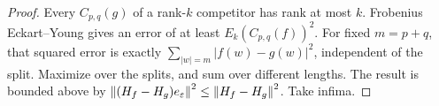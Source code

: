 \begin{proof}
Every $C_{p,q}(g)$ of a rank-$k$ competitor has rank at most $k$. Frobenius Eckart--Young gives an error of at least $E_k(C_{p,q}(f))^2$. For fixed $m=p+q$, that squared error is exactly $\sum_{|w|=m}|f(w)-g(w)|^2$, independent of the split. Maximize over the splits, and sum over different lengths. The result is bounded above by $\left\lVert(H_f-H_g)e_\varepsilon\right\rVert^2\le\left\lVert H_f-H_g\right\rVert^2$. Take infima.
\end{proof}
